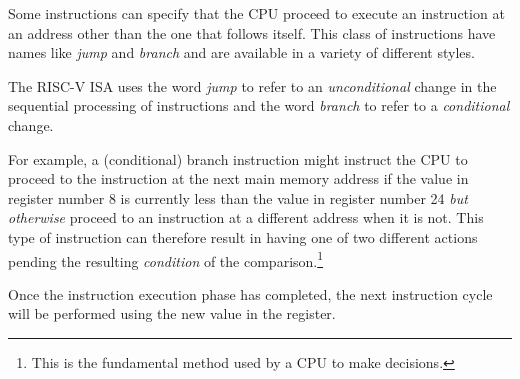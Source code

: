 Some instructions can specify that the CPU proceed to execute an
instruction at an address other than the one that follows itself.
This class of instructions have names like {\em jump} and {\em branch}
and are available in a variety of different styles.

The RISC-V ISA uses the word {\em jump} to refer to an {\em unconditional}
change in the sequential processing of instructions and the word
{\em branch} to refer to a {\em conditional} change.

For example, a (conditional) branch instruction might instruct the CPU 
to proceed to the instruction at the next main memory address if the value 
in register number 8 is currently less than the value in register number 
24 {\em but otherwise} proceed to an instruction at a different address
when it is not.  This type of instruction can therefore result in having 
one of two different actions pending the resulting {\em condition} of 
the comparison.\footnote{This is the fundamental method used by a CPU 
to make decisions.}

Once the instruction execution phase has completed, the next instruction 
cycle will be performed using the new value in the  register.

